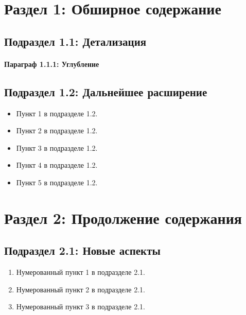 \section{Раздел 1: Обширное содержание}

\lipsum[1-10] %

\subsection{Подраздел 1.1: Детализация}

\lipsum[11-15] %

\paragraph{Параграф 1.1.1: Углубление}
\lipsum[16-18] %

\subsection{Подраздел 1.2: Дальнейшее расширение}

\lipsum[19-25] %

\begin{itemize}
    \item Пункт 1 в подразделе 1.2.
    \item Пункт 2 в подразделе 1.2.
    \item Пункт 3 в подразделе 1.2.
    \item Пункт 4 в подразделе 1.2.
    \item Пункт 5 в подразделе 1.2.
\end{itemize}

\lipsum[26-28] %

\section{Раздел 2: Продолжение содержания}

\lipsum[29-35] %

\subsection{Подраздел 2.1: Новые аспекты}

\lipsum[36-40] %

\begin{enumerate}
    \item Нумерованный пункт 1 в подразделе 2.1.
    \item Нумерованный пункт 2 в подразделе 2.1.
    \item Нумерованный пункт 3 в подразделе 2.1.
\end{enumerate}

